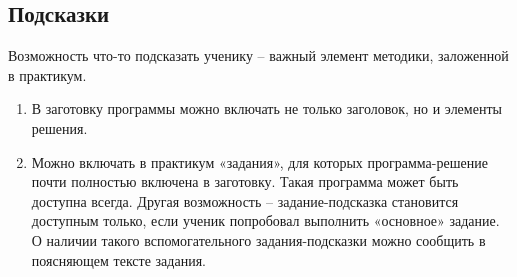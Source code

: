 \subsection {Подсказки}
Возможность что-то подсказать ученику – важный элемент методики, заложенной в практикум. 
\begin{enumerate}	
\item В заготовку программы можно включать не только заголовок, но и элементы решения.
\item Можно включать в практикум «задания», для которых программа-решение почти полностью включена в заготовку. 
Такая программа может быть доступна всегда. 
Другая возможность – задание-подсказка становится доступным только, 
если ученик попробовал выполнить «основное» задание. 
О наличии такого вспомогательного задания-подсказки можно сообщить в поясняющем тексте задания.
\end{enumerate}

